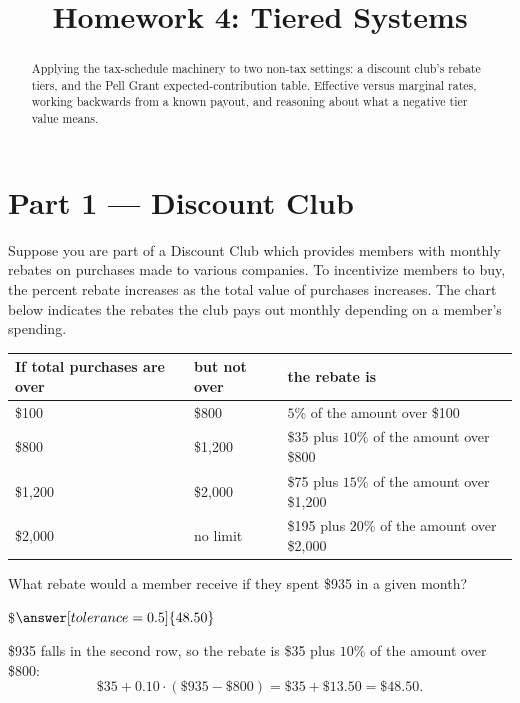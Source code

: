 \documentclass[12pt]{ximera}
\title{Homework 4: Tiered Systems}
\begin{document}
\begin{abstract}
Applying the tax-schedule machinery to two non-tax settings: a discount club's rebate
tiers, and the Pell Grant expected-contribution table. Effective versus marginal rates,
working backwards from a known payout, and reasoning about what a negative tier value
means.
\end{abstract}
\maketitle

\section*{Part 1 --- Discount Club}

Suppose you are part of a Discount Club which provides members with monthly rebates on
purchases made to various companies. To incentivize members to buy, the percent rebate
increases as the total value of purchases increases. The chart below indicates the
rebates the club pays out monthly depending on a member's spending.

\begin{center}
\begin{tabular}{|l|l|l|}
\hline
\textbf{If total purchases are over} & \textbf{but not over} & \textbf{the rebate is} \\
\hline
\$100    & \$800    & $5\%$ of the amount over \$100 \\
\hline
\$800    & \$1,200  & \$35 plus $10\%$ of the amount over \$800 \\
\hline
\$1,200  & \$2,000  & \$75 plus $15\%$ of the amount over \$1,200 \\
\hline
\$2,000  & no limit & \$195 plus $20\%$ of the amount over \$2,000 \\
\hline
\end{tabular}
\end{center}

\begin{problem}
What rebate would a member receive if they spent \$935 in a given month?

\$$\answer[tolerance=0.5]{48.50}$

\begin{freeResponse}
\end{freeResponse}

\begin{solution}
\$935 falls in the second row, so the rebate is \$35 plus $10\%$ of the amount over
\$800:
\[
\$35 + 0.10 \cdot (\$935 - \$800) = \$35 + \$13.50 = \$48.50.
\]
\end{solution}
\end{problem}
\end{document}
